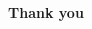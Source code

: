 \begin{frame}
\begin{columns}
{\begin{column}{0.5\textwidth}
		\end{column}}
	\end{columns}
\end{frame}

\begin{frame}{}
	\centering
	\Huge{\textbf{Thank you}}
\end{frame}
